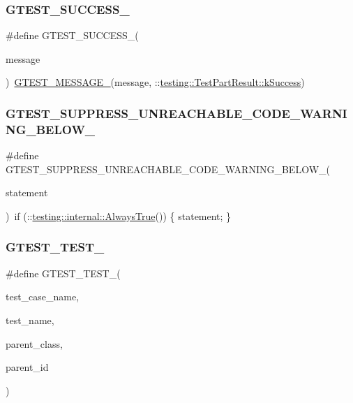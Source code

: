 \subsubsection{\texorpdfstring{GTEST\_SUCCESS\_}{GTEST\_SUCCESS\_}}
{\footnotesize\ttfamily \#define G\+T\+E\+S\+T\+\_\+\+S\+U\+C\+C\+E\+S\+S\+\_\+(\begin{DoxyParamCaption}\item[{}]{message }\end{DoxyParamCaption})~\mbox{\hyperlink{gtest-internal_8h_a94c73d5368ec946bc354d0992ad00810}{G\+T\+E\+S\+T\+\_\+\+M\+E\+S\+S\+A\+G\+E\+\_\+}}(message, \+::\mbox{\hyperlink{classtesting_1_1_test_part_result_a65ae656b33fdfdfffaf34858778a52d5a8fa3d06b2baad8bf7c1f17dea314983e}{testing\+::\+Test\+Part\+Result\+::k\+Success}})}

\mbox{\label{gtest-internal_8h_a2e66f7dfc5cb87e0fa0289f653173c69}} 
\subsubsection{\texorpdfstring{GTEST\_SUPPRESS\_UNREACHABLE\_CODE\_WARNING\_BELOW\_}{GTEST\_SUPPRESS\_UNREACHABLE\_CODE\_WARNING\_BELOW\_}}
{\footnotesize\ttfamily \#define G\+T\+E\+S\+T\+\_\+\+S\+U\+P\+P\+R\+E\+S\+S\+\_\+\+U\+N\+R\+E\+A\+C\+H\+A\+B\+L\+E\+\_\+\+C\+O\+D\+E\+\_\+\+W\+A\+R\+N\+I\+N\+G\+\_\+\+B\+E\+L\+O\+W\+\_\+(\begin{DoxyParamCaption}\item[{}]{statement }\end{DoxyParamCaption})~if (\+::\mbox{\hyperlink{namespacetesting_1_1internal_a4d46f09c3bfe68700b7f728d2cc3782f}{testing\+::internal\+::\+Always\+True}}()) \{ statement; \}}

\mbox{\label{gtest-internal_8h_ae2d26f0f92fbaf62bf4c1eca45bb2f1f}} 
\subsubsection{\texorpdfstring{GTEST\_TEST\_}{GTEST\_TEST\_}}
{\footnotesize\ttfamily \#define G\+T\+E\+S\+T\+\_\+\+T\+E\+S\+T\+\_\+(\begin{DoxyParamCaption}\item[{}]{test\+\_\+case\+\_\+name,  }\item[{}]{test\+\_\+name,  }\item[{}]{parent\+\_\+class,  }\item[{}]{parent\+\_\+id }\end{DoxyParamCaption})}

